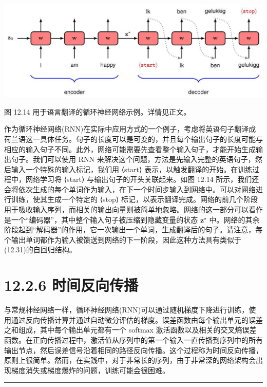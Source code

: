\documentclass[10pt]{report}
\newcommand{\HRule}{\begin{center}\rule{0.9\linewidth}{0.2mm}\end{center}}
\begin{document}
\begin{center}
\includegraphics[max width=1.0\textwidth]{images/0194e279-9b28-703a-88f4-c3ac21e2010d_400_286_354_1245_448_0.jpg}
\end{center}
\hspace*{3em} 

图 12.14 用于语言翻译的循环神经网络示例。详情见正文。

作为循环神经网络(RNN)在实际中应用方式的一个例子，考虑将英语句子翻译成荷兰语这一具体任务。句子的长度可以是可变的，并且每个输出句子的长度可能与相应的输入句子不同。此外，网络可能需要先查看整个输入句子，才能开始生成输出句子。我们可以使用 RNN 来解决这个问题，方法是先输入完整的英语句子，然后输入一个特殊的输入标记，我们用 ⟨start⟩ 表示，以触发翻译的开始。在训练过程中，网络学习将 ⟨start⟩ 与输出句子的开头关联起来。如图 12.14 所示，我们还会将依次生成的每个单词作为输入，在下一个时间步输入到网络中。可以对网络进行训练，使其生成一个特定的 ⟨stop⟩ 标记，以表示翻译完成。网络的前几个阶段用于吸收输入序列，而相关的输出向量则被简单地忽略。网络的这一部分可以看作是一个“编码器”，其中整个输入句子被压缩到隐藏变量的状态 \({\mathbf{z}}^{ \star  }\) 中。网络的其余阶段起到“解码器”的作用，它一次输出一个单词，生成翻译后的句子。请注意，每个输出单词都作为输入被馈送到网络的下一阶段，因此这种方法具有类似于(12.31)的自回归结构。

\section*{12.2.6 时间反向传播}

与常规神经网络一样，循环神经网络(RNN)可以通过随机梯度下降进行训练，使用通过反向传播计算并通过自动微分评估的梯度。误差函数由每个输出单元的误差之和组成，其中每个输出单元都有一个 softmax 激活函数以及相关的交叉熵误差函数。在正向传播过程中，激活值从序列中的第一个输入一直传播到序列中的所有输出节点，然后误差信号沿着相同的路径反向传播。这个过程称为时间反向传播，原则上很简单。然而，在实践中，对于非常长的序列，由于非常深的网络架构会出现梯度消失或梯度爆炸的问题，训练可能会很困难。

\HRule
\end{document}
